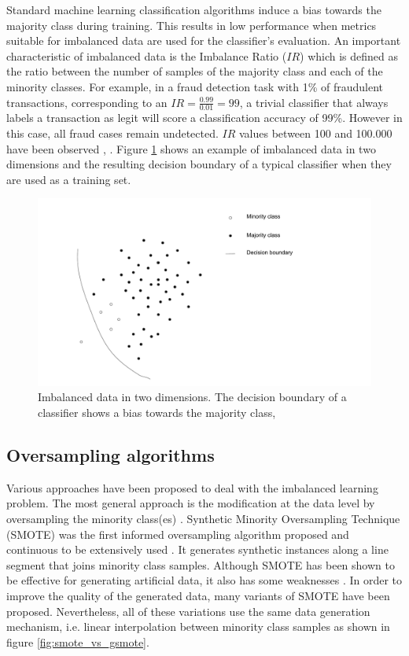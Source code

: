 \documentclass[preprint,12pt, a4paper]{elsarticle}
\begin{document}
Standard machine learning classification algorithms induce a bias towards the majority class during training. This results in low performance when metrics suitable for imbalanced data are used for the classifier's evaluation. An important characteristic of imbalanced data is the Imbalance Ratio ($IR$) which is defined as the ratio between the number of samples of the majority class and each of the minority classes. For example, in a fraud detection task with 1\% of fraudulent transactions, corresponding to an $IR=\frac{0.99}{0.01}=99$, a trivial classifier that always labels a transaction as legit will score a classification accuracy of 99\%. However in this case, all fraud cases remain undetected. $IR$ values between 100 and 100.000 have been observed \cite{Chawla2002}, \cite{Barua2014}. Figure \ref{fig:imbalanced} shows an example of imbalanced data in two dimensions and the resulting decision boundary of a typical classifier when they are used as a training set.

\begin{figure}[H]
	\centering
    \includegraphics[width=14cm, keepaspectratio]{../analysis/imbalanced_problem}
    \caption{Imbalanced data in two dimensions. The decision boundary of a classifier shows a bias towards the majority class,}
    \label{fig:imbalanced}
\end{figure}

\subsection{Oversampling algorithms}
\label{oversampling}

Various approaches have been proposed to deal with the imbalanced learning problem. The most general approach is the modification at the data level by oversampling the minority class(es) \cite{Fernandez2013}. Synthetic Minority
Oversampling Technique (SMOTE) was the first informed oversampling algorithm proposed and continuous to be extensively used \cite{Chawla2002}. It generates synthetic instances along a line segment that joins minority class samples. Although SMOTE has been shown to be effective for generating artificial data, it also has some weaknesses \cite{He2009}. In order to improve the quality of the generated data, many variants of SMOTE have been proposed. Nevertheless, all of these variations use the same data generation mechanism, i.e. linear interpolation between minority class samples as shown in figure \ref{fig:smote_vs_gsmote}.
\end{document}
